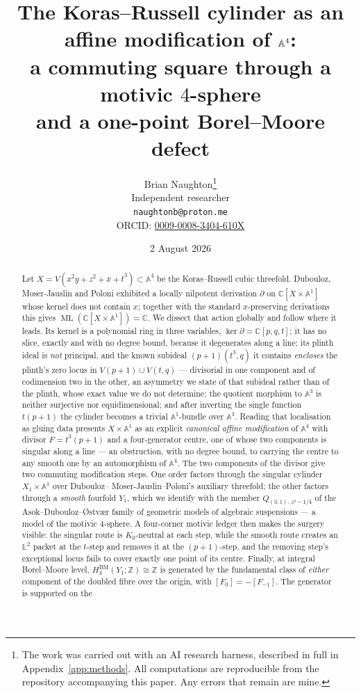 \documentclass[11pt]{article}
\title{The Koras--Russell cylinder as an affine modification of $\Aff{4}$:\\
a commuting square through a motivic $4$-sphere\\
and a one-point Borel--Moore defect}
\author{Brian Naughton\thanks{The work was carried out with an AI research
harness, described in full in Appendix~\ref{app:methods}. All computations are
reproducible from the repository accompanying this paper. Any errors that
remain are mine.}\\[2pt]
{\normalsize Independent researcher}\\[1pt]
{\normalsize\texttt{naughtonb@proton.me}}\\[1pt]
{\normalsize ORCID: \href{https://orcid.org/0009-0008-3404-610X}
{0009-0008-3404-610X}}}
\date{2 August 2026}
\theoremstyle{definition}
\theoremstyle{remark}
\newcommand{\C}{\mathbb{C}}
\newcommand{\Z}{\mathbb{Z}}
\newcommand{\Aff}[1]{\mathbb{A}^{#1}}
\newcommand{\Lef}{\mathbb{L}}
\newcommand{\HBM}[1]{H^{\mathrm{BM}}_{#1}}
\newcommand{\ML}{\operatorname{ML}}
\begin{document}
\maketitle

\begin{abstract}
Let $X=V(x^2y+z^2+x+t^3)\subset\Aff{4}$ be the Koras--Russell cubic
threefold. Dubouloz, Moser-Jauslin and Poloni exhibited a locally nilpotent
derivation $\partial$ on $\C[X\times\Aff{1}]$ whose kernel does not contain
$x$; together with the standard $x$-preserving derivations this gives
$\ML(\C[X\times\Aff{1}])=\C$. We dissect that action globally and follow where
it leads. Its kernel is a polynomial ring in three variables,
$\ker\partial=\C[p,q,t]$; it has no slice, exactly and with no degree bound,
because it degenerates along a line; its plinth ideal is \emph{not} principal,
and the known subideal $(p+1)(t^3,q)$ it contains \emph{encloses} the plinth's
zero locus in $V(p+1)\cup V(t,q)$ --- divisorial in one component and of
codimension two in the other, an asymmetry we state of that subideal rather
than of the plinth, whose exact value we do not determine; the quotient
morphism to $\Aff{3}$ is neither surjective nor equidimensional; and after
inverting the single function $t(p+1)$ the cylinder becomes a trivial
$\Aff{1}$-bundle over $\Aff{3}$.
Reading that localisation as gluing data presents $X\times\Aff{1}$ as an
explicit \emph{canonical affine modification} of $\Aff{4}$ with divisor
$F=t^3(p+1)$ and a four-generator centre, one of whose two components is
singular along a line --- an obstruction, with no degree bound, to carrying
the centre to any smooth one by an automorphism of $\Aff{4}$. The two
components of the divisor give two commuting modification steps. One order
factors through the singular cylinder $X_1\times\Aff{1}$ over Dubouloz--
Moser-Jauslin--Poloni's auxiliary threefold; the other factors through a
\emph{smooth} fourfold $Y_1$, which we identify with the member
$Q_{(3,1),\,z^2-1/4}$ of the Asok--Dubouloz--{\O}stv{\ae}r family of geometric
models of algebraic suspensions --- a model of the motivic $4$-sphere. A
four-corner motivic ledger then makes the surgery visible: the singular route
is $K_0$-neutral at each step, while the smooth route creates an $\Lef^2$
packet at the $t$-step and removes it at the $(p+1)$-step, and the removing
step's exceptional locus fails to cover exactly one point of its centre.
Finally, at integral Borel--Moore level, $\HBM{4}(Y_1;\Z)\cong\Z$ is generated
by the fundamental class of \emph{either} component of the doubled fibre over
the origin, with $[F_0]=-[F_{-1}]$. The generator is supported on the

\end{abstract}
\end{document}
